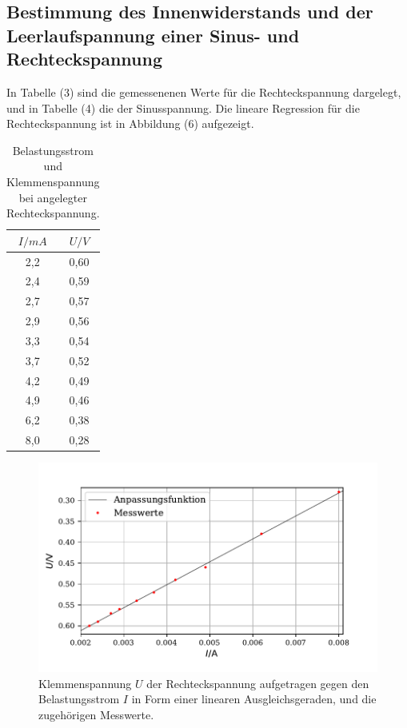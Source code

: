 \subsection{Bestimmung des Innenwiderstands und der Leerlaufspannung einer Sinus- und Rechteckspannung}
In Tabelle  (3) sind die gemessenenen Werte für die Rechteckspannung dargelegt, und in Tabelle (4) die der Sinusspannung.
Die lineare Regression für die Rechteckspannung ist in Abbildung (6) aufgezeigt.

\begin{table}[H]
  \centering
  \caption{Belastungsstrom und Klemmenspannung bei angelegter Rechteckspannung.}
  \begin{tabular}{c c}
    \toprule
     $I/mA$ & $U/V$  \\
    \midrule
    2,2 & 0,60 \\
    2,4 & 0,59 \\
    2,7 & 0,57 \\
    2,9 & 0,56 \\
    3,3 & 0,54 \\
    3,7 & 0,52 \\
    4,2 & 0,49 \\
    4,9 & 0,46 \\
    6,2 & 0,38 \\
    8,0 & 0,28 \\
   
  \bottomrule
  \end{tabular}
\end{table}

\begin{figure}[H]
  \centering
  \includegraphics{plot3.pdf}
  \caption{Klemmenspannung $U$ der Rechteckspannung aufgetragen gegen den Belastungsstrom $I$ in Form einer linearen Ausgleichsgeraden, und die zugehörigen Messwerte.}
  \label{fig:rechteck}
\end{figure}

